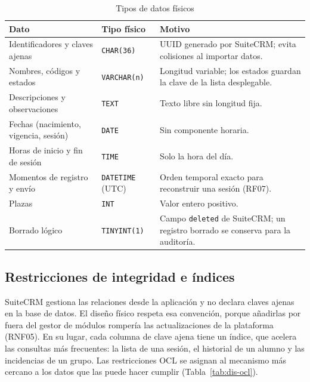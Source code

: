\begin{table}[H]
\centering\small
\begin{tabularx}{\textwidth}{>{\hsize=0.85\hsize\raggedright\arraybackslash}X>{\hsize=0.70\hsize\raggedright\arraybackslash}X>{\hsize=1.45\hsize\raggedright\arraybackslash}X}
\toprule
\rowcolor{cabeceratabla} \textbf{Dato} & \textbf{Tipo físico} & \textbf{Motivo} \\
\midrule
Identificadores y claves ajenas & \texttt{CHAR(36)} & UUID generado por SuiteCRM; evita colisiones al importar datos. \\
Nombres, códigos y estados & \texttt{VARCHAR(n)} & Longitud variable; los estados guardan la clave de la lista desplegable. \\
Descripciones y observaciones & \texttt{TEXT} & Texto libre sin longitud fija. \\
Fechas (nacimiento, vigencia, sesión) & \texttt{DATE} & Sin componente horaria. \\
Horas de inicio y fin de sesión & \texttt{TIME} & Solo la hora del día. \\
Momentos de registro y envío & \texttt{DATETIME} (UTC) & Orden temporal exacto para reconstruir una sesión (RF07). \\
Plazas & \texttt{INT} & Valor entero positivo. \\
Borrado lógico & \texttt{TINYINT(1)} & Campo \texttt{deleted} de SuiteCRM; un registro borrado se conserva para la auditoría. \\
\bottomrule
\end{tabularx}
\caption{Tipos de datos físicos}\label{tab:dis-tipos}
\end{table}

\subsection{Restricciones de integridad e índices}\label{sec:dis-restricciones}

SuiteCRM gestiona las relaciones desde la aplicación y no declara claves ajenas en la base de datos. El diseño físico respeta esa convención, porque añadirlas por fuera del gestor de módulos rompería las actualizaciones de la plataforma (RNF05). En su lugar, cada columna de clave ajena tiene un índice, que acelera las consultas más frecuentes: la lista de una sesión, el historial de un alumno y las incidencias de un grupo. Las restricciones OCL se asignan al mecanismo más cercano a los datos que las puede hacer cumplir (Tabla~\ref{tab:dis-ocl}).

